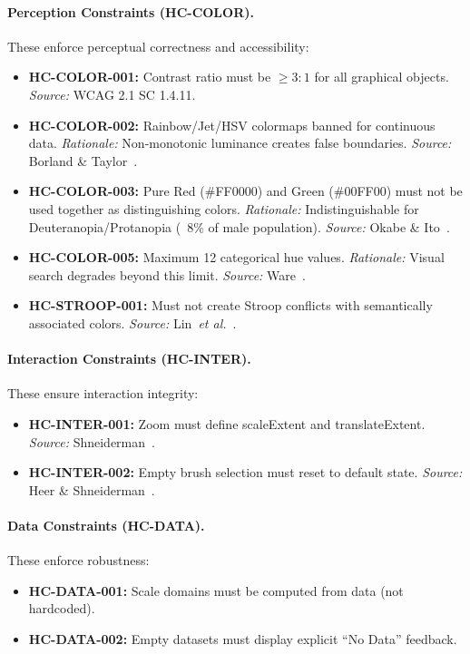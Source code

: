 \documentclass[journal]{vgtc}
\newcommand{\etal}{\textit{et al.}}
\begin{document}
\paragraph{Perception Constraints (HC-COLOR).}
These enforce perceptual correctness and accessibility:
\begin{itemize}
\item \textbf{HC-COLOR-001:} Contrast ratio must be $\geq 3{:}1$ for all graphical objects. \textit{Source:} WCAG 2.1 SC 1.4.11.
\item \textbf{HC-COLOR-002:} Rainbow/Jet/HSV colormaps banned for continuous data. \textit{Rationale:} Non-monotonic luminance creates false boundaries. \textit{Source:} Borland \& Taylor~\cite{borland2007rainbow}.
\item \textbf{HC-COLOR-003:} Pure Red (\#FF0000) and Green (\#00FF00) must not be used together as distinguishing colors. \textit{Rationale:} Indistinguishable for Deuteranopia/Protanopia (~8\% of male population). \textit{Source:} Okabe \& Ito~\cite{okabe2008color}.
\item \textbf{HC-COLOR-005:} Maximum 12 categorical hue values. \textit{Rationale:} Visual search degrades beyond this limit. \textit{Source:} Ware~\cite{ware2004information}.
\item \textbf{HC-STROOP-001:} Must not create Stroop conflicts with semantically associated colors. \textit{Source:} Lin~\etal{}~\cite{lin2013selecting}.
\end{itemize}

\paragraph{Interaction Constraints (HC-INTER).}
These ensure interaction integrity:
\begin{itemize}
\item \textbf{HC-INTER-001:} Zoom must define scaleExtent and translateExtent. \textit{Source:} Shneiderman~\cite{shneiderman1996eyes}.
\item \textbf{HC-INTER-002:} Empty brush selection must reset to default state. \textit{Source:} Heer \& Shneiderman~\cite{heer2012interactive}.
\end{itemize}

\paragraph{Data Constraints (HC-DATA).}
These enforce robustness:
\begin{itemize}
\item \textbf{HC-DATA-001:} Scale domains must be computed from data (not hardcoded).
\item \textbf{HC-DATA-002:} Empty datasets must display explicit ``No Data'' feedback.
\end{itemize}
\end{document}
